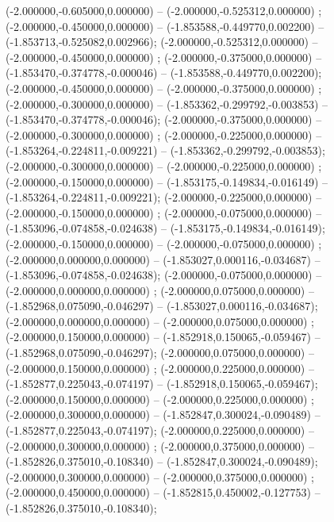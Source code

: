  (-2.000000,-0.605000,0.000000) -- (-2.000000,-0.525312,0.000000) ;
 (-2.000000,-0.450000,0.000000) -- (-1.853588,-0.449770,0.002200) -- (-1.853713,-0.525082,0.002966);
 (-2.000000,-0.525312,0.000000) -- (-2.000000,-0.450000,0.000000) ;
 (-2.000000,-0.375000,0.000000) -- (-1.853470,-0.374778,-0.000046) -- (-1.853588,-0.449770,0.002200);
 (-2.000000,-0.450000,0.000000) -- (-2.000000,-0.375000,0.000000) ;
 (-2.000000,-0.300000,0.000000) -- (-1.853362,-0.299792,-0.003853) -- (-1.853470,-0.374778,-0.000046);
 (-2.000000,-0.375000,0.000000) -- (-2.000000,-0.300000,0.000000) ;
 (-2.000000,-0.225000,0.000000) -- (-1.853264,-0.224811,-0.009221) -- (-1.853362,-0.299792,-0.003853);
 (-2.000000,-0.300000,0.000000) -- (-2.000000,-0.225000,0.000000) ;
 (-2.000000,-0.150000,0.000000) -- (-1.853175,-0.149834,-0.016149) -- (-1.853264,-0.224811,-0.009221);
 (-2.000000,-0.225000,0.000000) -- (-2.000000,-0.150000,0.000000) ;
 (-2.000000,-0.075000,0.000000) -- (-1.853096,-0.074858,-0.024638) -- (-1.853175,-0.149834,-0.016149);
 (-2.000000,-0.150000,0.000000) -- (-2.000000,-0.075000,0.000000) ;
 (-2.000000,0.000000,0.000000) -- (-1.853027,0.000116,-0.034687) -- (-1.853096,-0.074858,-0.024638);
 (-2.000000,-0.075000,0.000000) -- (-2.000000,0.000000,0.000000) ;
 (-2.000000,0.075000,0.000000) -- (-1.852968,0.075090,-0.046297) -- (-1.853027,0.000116,-0.034687);
 (-2.000000,0.000000,0.000000) -- (-2.000000,0.075000,0.000000) ;
 (-2.000000,0.150000,0.000000) -- (-1.852918,0.150065,-0.059467) -- (-1.852968,0.075090,-0.046297);
 (-2.000000,0.075000,0.000000) -- (-2.000000,0.150000,0.000000) ;
 (-2.000000,0.225000,0.000000) -- (-1.852877,0.225043,-0.074197) -- (-1.852918,0.150065,-0.059467);
 (-2.000000,0.150000,0.000000) -- (-2.000000,0.225000,0.000000) ;
 (-2.000000,0.300000,0.000000) -- (-1.852847,0.300024,-0.090489) -- (-1.852877,0.225043,-0.074197);
 (-2.000000,0.225000,0.000000) -- (-2.000000,0.300000,0.000000) ;
 (-2.000000,0.375000,0.000000) -- (-1.852826,0.375010,-0.108340) -- (-1.852847,0.300024,-0.090489);
 (-2.000000,0.300000,0.000000) -- (-2.000000,0.375000,0.000000) ;
 (-2.000000,0.450000,0.000000) -- (-1.852815,0.450002,-0.127753) -- (-1.852826,0.375010,-0.108340);
